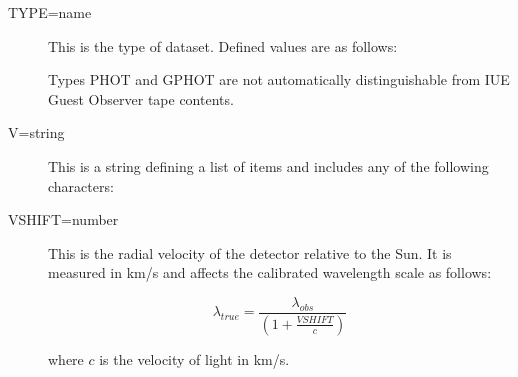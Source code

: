 \begin {description}
\item [TYPE=name]
This is the type of dataset.
Defined values are as follows:

\begin {quote}
\end {quote}

Types PHOT and GPHOT are not automatically distinguishable from IUE
Guest Observer tape contents.

\item [V=string]
This is a string defining a list of items and includes
any of the following characters:

\begin {quote}
\end {quote}

\item [VSHIFT=number]
This is the radial velocity of the detector relative to the Sun.
It is measured in km/s and affects the calibrated wavelength
scale as follows:

\begin {equation}
\lambda_{true} = \frac {\lambda_{obs}}{(1 + \frac {VSHIFT}{c})}
\end {equation}

where $c$ is the velocity of light in km/s.


\end{description}
